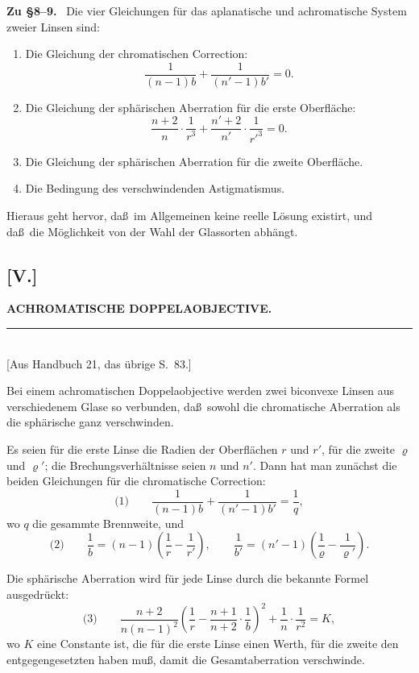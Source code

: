 \documentclass[12pt,a4paper]{article}
\theoremstyle{plain}
\theoremstyle{definition}
\theoremstyle{remark}
\begin{document}
\textbf{Zu \S 8--9.} \ Die vier Gleichungen f\"ur das aplanatische
und achromatische System zweier Linsen sind:
\begin{enumerate}
\item Die Gleichung der chromatischen Correction:
\[
\frac{1}{(n-1)b} + \frac{1}{(n'-1)b'} = 0.
\]
\item Die Gleichung der sph\"arischen Aberration f\"ur die erste
Oberfl\"ache:
\[
\frac{n+2}{n}\cdot\frac{1}{r^{3}}
+ \frac{n'+2}{n'}\cdot\frac{1}{r'^{3}} = 0.
\]
\item Die Gleichung der sph\"arischen Aberration f\"ur die zweite
Oberfl\"ache.
\item Die Bedingung des verschwindenden Astigmatismus.
\end{enumerate}
Hieraus geht hervor, da\ss\ im Allgemeinen keine reelle L\"osung
existirt, und da\ss\ die M\"oglichkeit von der Wahl der Glassorten
abh\"angt.


\newpage
\subsection*{[V.]}
\begin{center}
\textbf{ACHROMATISCHE DOPPELAOBJECTIVE.}
\end{center}
\begin{center}
\rule{6cm}{0.4pt}\\[4pt]
[Aus Handbuch 21, das \"ubrige S.~83.]
\end{center}

Bei einem achromatischen Doppelaobjective werden zwei
biconvexe Linsen aus verschiedenem Glase so verbunden, da\ss\ sowohl
die chromatische Aberration als die sph\"arische ganz verschwinden.

Es seien f\"ur die erste Linse die Radien der Oberfl\"achen $r$ und
$r'$, f\"ur die zweite $\varrho$ und $\varrho'$; die Brechungsverh\"altnisse
seien $n$ und $n'$. Dann hat man zun\"achst die beiden Gleichungen
f\"ur die chromatische Correction:
\[
\text{(1)}\qquad \frac{1}{(n-1)b} + \frac{1}{(n'-1)b'} = \frac{1}{q},
\]
wo $q$ die gesammte Brennweite, und
\[
\text{(2)}\qquad \frac{1}{b} = (n-1)\left(\frac{1}{r} - \frac{1}{r'}\right),\qquad
\frac{1}{b'} = (n'-1)\left(\frac{1}{\varrho} - \frac{1}{\varrho'}\right).
\]

Die sph\"arische Aberration wird f\"ur jede Linse durch die bekannte
Formel ausgedr\"uckt:
\[
\text{(3)}\qquad
\frac{n+2}{n(n-1)^{2}}\left(\frac{1}{r} - \frac{n+1}{n+2}\cdot\frac{1}{b}\right)^{2}
+ \frac{1}{n}\cdot\frac{1}{r^{2}} = K,
\]
wo $K$ eine Constante ist, die f\"ur die erste Linse einen Werth,
f\"ur die zweite den entgegengesetzten haben mu\ss, damit die
Gesamtaberration verschwinde.
\end{document}
